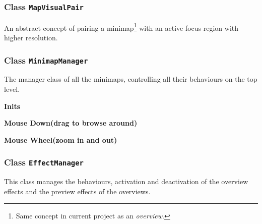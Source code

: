 \subsubsection{Class \texttt{MapVisualPair}}

An abstract concept of pairing a minimap\footnote{ Same concept in current project as an \emph{overview}. } with an active focus region with higher resolution.






\subsubsection{Class \texttt{MinimapManager}}

The manager class of all the minimaps, controlling all their behaviours on the top level.

\textbf{Inits}




\textbf{Mouse Down(drag to browse around)}






\textbf{Mouse Wheel(zoom in and out)}






\subsubsection{Class \texttt{EffectManager}}

This class manages the behaviours, activation and deactivation of the overview effects and the preview effects of the overviews.

